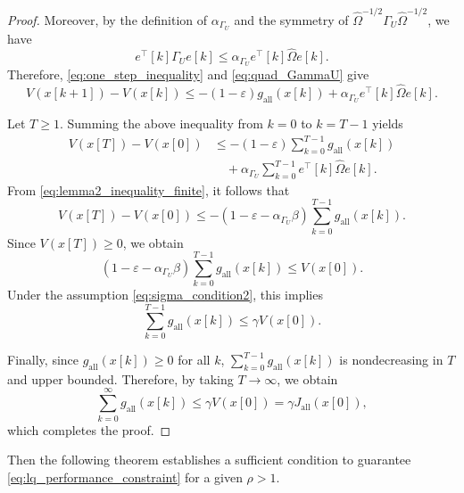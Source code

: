 \documentclass[letterpaper,10pt,conference]{ieeeconf}
\begin{document}
\begin{proof}
  Moreover, by the definition of $\alpha_{\Gamma_U}$ and the symmetry of
  $\hat{\Omega}^{-1/2}\Gamma_U\hat{\Omega}^{-1/2}$, we have
  \begin{equation} \label{eq:quad_GammaU}
    e^\top[k] \Gamma_U e[k]
    \leq
    \alpha_{\Gamma_U} e^\top[k] \hat{\Omega} e[k].
  \end{equation}
  Therefore, \eqref{eq:one_step_inequality} and \eqref{eq:quad_GammaU} give
  \begin{equation}
    V(x[k+1]) - V(x[k])
    \leq
    -(1-\varepsilon) g_{\mathrm{all}}(x[k]) + \alpha_{\Gamma_U} e^\top[k] \hat{\Omega} e[k].
  \end{equation}

  Let $T \ge 1$.
  Summing the above inequality from $k=0$ to $k=T-1$ yields
  \begin{align}
    V(x[T]) - V(x[0])
    &\leq
    -(1-\varepsilon)\sum_{k=0}^{T-1} g_{\mathrm{all}}(x[k]) \\
    &\quad +
    \alpha_{\Gamma_U}\sum_{k=0}^{T-1} e^\top[k] \hat{\Omega} e[k].
  \end{align}
  From \eqref{eq:lemma2_inequality_finite}, it follows that
  \begin{equation}
    V(x[T]) - V(x[0])
    \leq
    -
    (1-\varepsilon-\alpha_{\Gamma_U}\beta)
    \sum_{k=0}^{T-1} g_{\mathrm{all}}(x[k]).
  \end{equation}
  Since $V(x[T]) \ge 0$, we obtain
  \begin{equation}
    (1-\varepsilon-\alpha_{\Gamma_U}\beta)
    \sum_{k=0}^{T-1} g_{\mathrm{all}}(x[k])
    \le
    V(x[0]).
  \end{equation}
  Under the assumption \eqref{eq:sigma_condition2}, this implies
  \begin{equation}
    \sum_{k=0}^{T-1} g_{\mathrm{all}}(x[k])
    \leq
    \gamma V(x[0]).
  \end{equation}

  Finally, since $g_{\mathrm{all}}(x[k]) \geq 0$ for all $k$, $\sum_{k=0}^{T-1} g_{\mathrm{all}}(x[k])$ is nondecreasing in $T$ and upper bounded.
  Therefore, by taking $T \to \infty$, we obtain
  \begin{equation}
    \sum_{k=0}^{\infty} g_{\mathrm{all}}(x[k])
    \leq
    \gamma V(x[0])
    =
    \gamma J_{\mathrm{all}}(x[0]),
  \end{equation}
  which completes the proof.
\end{proof}

Then the following theorem establishes a sufficient condition to guarantee \eqref{eq:lq_performance_constraint} for a given $\rho > 1$.
\end{document}

